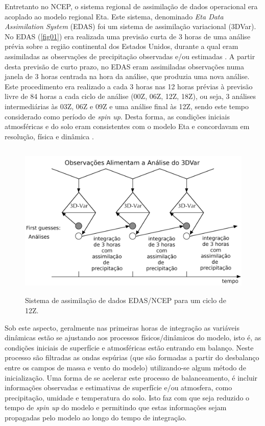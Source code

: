 Entretanto no NCEP, o sistema regional de assimilação de dados operacional era acoplado ao modelo regional Eta. Este sistema, denominado \textit{Eta Data Assimilation System} (EDAS) foi um sistema de assimilação variacional (3DVar). No EDAS (\autoref{fig01}) era realizada uma previsão curta de 3 horas de uma análise prévia sobre a região continental dos Estados Unidos, durante a qual eram assimiladas as observações de precipitação observadas e/ou estimadas \cite{messingeretal06}. A partir desta previsão de curto prazo, no EDAS eram assimiladas observações numa janela de 3 horas centrada na hora da análise, que produzia uma nova análise. Este procedimento era realizado a cada 3 horas nas 12 horas prévias à previsão livre de 84 horas a cada ciclo de análise (00Z, 06Z, 12Z, 18Z), ou seja, 3 análises intermediárias às 03Z, 06Z e 09Z e uma análise final às 12Z, sendo este tempo considerado como período de \textit{spin up}. Desta forma, as condições iniciais atmosféricas e do solo eram consistentes com o modelo Eta e concordavam em resolução, física e dinâmica \cite{rogersetal96}. 

\begin{figure}[!hbp]
\centering
\includegraphics[height=7.5cm]{./figs/edas_pt.png}
\caption{Sistema de assimilação de dados EDAS/NCEP para um ciclo de 12Z.}
\label{fig01}
\end{figure}

Sob este aspecto, geralmente nas primeiras horas de integração as variáveis dinâmicas estão se ajustando aos processos físicos/dinâmicos do modelo, isto é, as condições iniciais de superfície e atmosféricas estão entrando em balanço. Neste processo são filtradas as ondas espúrias (que são formadas a partir do desbalanço entre os campos de massa e vento do modelo) utilizando-se algum método de inicialização. Uma forma de se acelerar este processo de balanceamento, é incluir informações observadas e estimativas de superfície e/ou atmosfera, como precipitação, umidade e temperatura do solo. Isto faz com que seja reduzido o tempo de \textit{spin up} do modelo e permitindo que estas informações sejam propagadas pelo modelo ao longo do tempo de integração.

